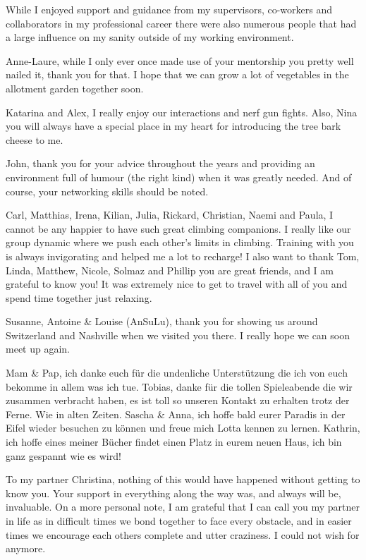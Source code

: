 \documentclass[
  12pt,
  openany]{book}
\begin{document}
While I enjoyed support and guidance from my supervisors, co-workers and collaborators in my professional career there were also numerous people that had a large influence on my sanity outside of my working environment.

Anne-Laure, while I only ever once made use of your mentorship you pretty well nailed it, thank you for that. I hope that we can grow a lot of vegetables in the allotment garden together soon.

Katarina and Alex, I really enjoy our interactions and nerf gun fights. Also, Nina you will always have a special place in my heart for introducing the tree bark cheese to me.

John, thank you for your advice throughout the years and providing an environment full of humour (the right kind) when it was greatly needed. And of course, your networking skills should be noted.

Carl, Matthias, Irena, Kilian, Julia, Rickard, Christian, Naemi and Paula, I cannot be any happier to have such great climbing companions. I really like our group dynamic where we push each other's limits in climbing. Training with you is always invigorating and helped me a lot to recharge!
I also want to thank Tom, Linda, Matthew, Nicole, Solmaz and Phillip you are great friends, and I am grateful to know you! It was extremely nice to get to travel with all of you and spend time together just relaxing.

Susanne, Antoine \& Louise (AnSuLu), thank you for showing us around Switzerland and Nashville when we visited you there. I really hope we can soon meet up again.

Mam \& Pap, ich danke euch für die undenliche Unterstützung die ich von euch bekomme in allem was ich tue. Tobias, danke für die tollen Spieleabende die wir zusammen verbracht haben, es ist toll so unseren Kontakt zu erhalten trotz der Ferne. Wie in alten Zeiten. Sascha \& Anna, ich hoffe bald eurer Paradis in der Eifel wieder besuchen zu können und freue mich Lotta kennen zu lernen. Kathrin, ich hoffe eines meiner Bücher findet einen Platz in eurem neuen Haus, ich bin ganz gespannt wie es wird!

To my partner Christina, nothing of this would have happened without getting to know you. Your support in everything along the way was, and always will be, invaluable. On a more personal note, I am grateful that I can call you my partner in life as in difficult times we bond together to face every obstacle, and in easier times we encourage each others complete and utter craziness. I could not wish for anymore.
\end{document}
